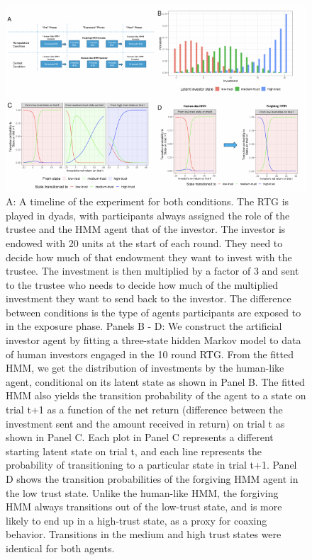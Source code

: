\documentclass[
]{article}
\begin{document}
\begin{landscape}
\begin{figure}

{\centering \includegraphics[width=1\linewidth,height=1\textheight]{article_files/figure-latex/HMMPanels-1} 

}

\caption{\small{A: A timeline of the experiment for both conditions. The RTG is played in dyads, with participants always assigned the role of the trustee and the HMM agent that of the investor. The investor is endowed with 20 units at the start of each round. They need to decide how much of that endowment they want to invest with the trustee. The investment is then multiplied by a factor of 3 and sent to the trustee who needs to decide how much of the multiplied investment they want to send back to the investor. The difference between conditions is the type of agents participants are exposed to in the exposure phase. Panels B - D: We construct the artificial investor agent by fitting a three-state hidden Markov model to data of human investors engaged in the 10 round RTG. From the fitted HMM, we get the distribution of investments by the human-like agent, conditional on its latent state as shown in Panel B. The fitted HMM also yields the transition probability of the agent to a state on trial t+1 as a function of the net return (difference between the investment sent and the amount received in return) on trial t as shown in Panel C. Each plot in Panel C represents a different starting latent state on trial t, and each line represents the probability of transitioning to a particular state in trial t+1. Panel D shows the transition probabilities of the forgiving HMM agent in the low trust state. Unlike the human-like HMM, the forgiving HMM always transitions out of the low-trust state, and is more likely to end up in a high-trust state, as a proxy for coaxing behavior. Transitions in the medium and high trust states were identical for both agents.}}\label{fig:HMMPanels}
\end{figure}
\end{landscape}
\end{document}

